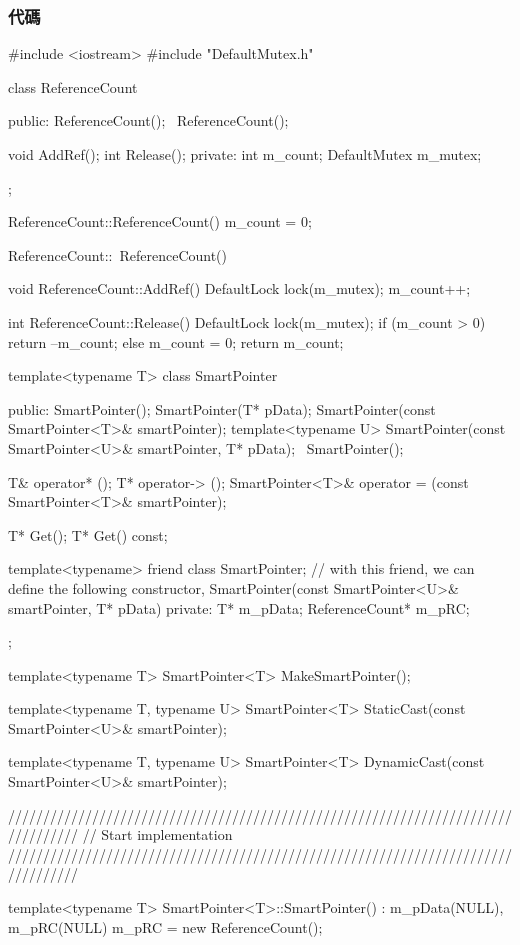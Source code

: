\subsubsection{代碼}
\begin{Code}
#include <iostream>
#include "DefaultMutex.h"

class ReferenceCount
{
 public:
    ReferenceCount();
    ~ReferenceCount();

    void AddRef();
    int Release();
 private:
    int m_count;
    DefaultMutex m_mutex;
};

ReferenceCount::ReferenceCount()
{
    m_count = 0;
}

ReferenceCount::~ReferenceCount()
{
}

void ReferenceCount::AddRef()
{
    DefaultLock lock(m_mutex);
    m_count++;
}

int ReferenceCount::Release()
{
    DefaultLock lock(m_mutex);
    if (m_count > 0)
    {
        return --m_count;
    }
    else
    {
        m_count = 0;
        return m_count;
    }
}

template<typename T>
class SmartPointer
{
 public:
    SmartPointer();
    SmartPointer(T* pData);
    SmartPointer(const SmartPointer<T>& smartPointer);
    template<typename U>
        SmartPointer(const SmartPointer<U>& smartPointer, T* pData);
    ~SmartPointer();

    T& operator* ();
    T* operator-> ();
    SmartPointer<T>& operator = (const SmartPointer<T>& smartPointer);

    T* Get();
    T* Get() const;

    template<typename> friend class SmartPointer; // with this friend, we can define the following constructor, SmartPointer(const SmartPointer<U>& smartPointer, T* pData)
 private:
    T* m_pData;
    ReferenceCount* m_pRC;
};

template<typename T>
SmartPointer<T> MakeSmartPointer();

template<typename T, typename U>
    SmartPointer<T> StaticCast(const SmartPointer<U>& smartPointer);

template<typename T, typename U>
    SmartPointer<T> DynamicCast(const SmartPointer<U>& smartPointer);

//////////////////////////////////////////////////////////////////////////////////
// Start implementation
//////////////////////////////////////////////////////////////////////////////////

template<typename T>
SmartPointer<T>::SmartPointer()
    : m_pData(NULL), m_pRC(NULL)
{
    m_pRC = new ReferenceCount();
}


\end{Code}
